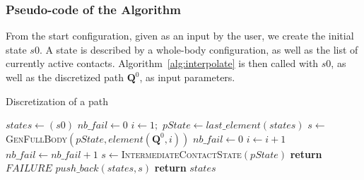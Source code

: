 \subsubsection{Pseudo-code of the Algorithm}
\label{app:contact}



From the start configuration, given as an input by the user,
we create the initial state $s0$. A state is described by a whole-body configuration, as well as the list of currently active contacts.
Algorithm~\ref{alg:interpolate}  is then called with $s0$, as well as the discretized path 
$\mathbf{Q}^0$, as input parameters.

\begin{algorithm}[!tbp]
\caption{Discretization of a path} \label{interpolate}
	\begin{algorithmic}[1]
		\State $states \gets (s0)$ 
		\State $nb\_fail \gets 0$ 
		\State $i \gets 1;$ 
			\State $pState \gets last\_element(states)$
			\State $s \gets$ \textsc{GenFullBody}$(pState, element(\mathbf{Q}^0,i))$
				\State $nb\_fail \gets 0$
				\State $i \gets i+1$
			\Else
				\State $nb\_fail \gets nb\_fail + 1$
				\State $s \gets $\textsc{IntermediateContactState}$(pState)$
					\State \textbf{return} $FAILURE$
				\EndIf		
			\EndIf
			\State $push\_back(states, s)$
		\EndWhile
		\State \textbf{return} $states$
	\EndFunction
\end{algorithmic}
\label{alg:interpolate}
\end{algorithm}

